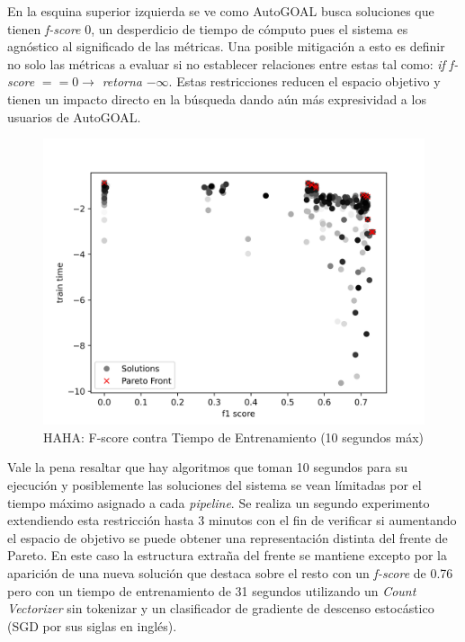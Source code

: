 En la esquina superior izquierda se ve como AutoGOAL busca soluciones que tienen \textit{f-score} 0, un desperdicio de tiempo de c\'omputo pues el sistema es agn\'ostico al significado de las m\'etricas. Una posible mitigaci\'on a esto es definir no solo las m\'etricas a evaluar si no establecer relaciones entre estas tal como: \textit{if f-score} $== 0 \rightarrow $ \textit{retorna} $-\infty$. Estas restricciones reducen el espacio objetivo y tienen un impacto directo en la b\'usqueda dando a\'un m\'as expresividad a los usuarios de AutoGOAL.

\begin{figure}[ht]
    \centering
    \includegraphics[scale=0.65]{Pictures/haha_fscore_vs_time.jpg}
    \caption{HAHA: F-score contra Tiempo de Entrenamiento (10 segundos m\'ax)}
    \label{impl:fig:haha:fscore_vs_time}
\end{figure}

Vale la pena resaltar que hay algoritmos que toman 10 segundos para su ejecuci\'on y posiblemente las soluciones del sistema se vean l\'imitadas por el tiempo m\'aximo asignado a cada \textit{pipeline}. Se realiza un segundo experimento extendiendo esta restricci\'on hasta 3 minutos con el fin de verificar si aumentando el espacio de objetivo se puede obtener una representaci\'on distinta del frente de Pareto. En este caso la estructura extra\~na del frente se mantiene excepto por la aparici\'on de una nueva soluci\'on que destaca sobre el resto con un \textit{f-score} de 0.76 pero con un tiempo de entrenamiento de 31 segundos utilizando un \textit{Count Vectorizer} sin tokenizar y un  clasificador  de gradiente de descenso estoc\'astico (SGD por sus siglas en ingl\'es).

